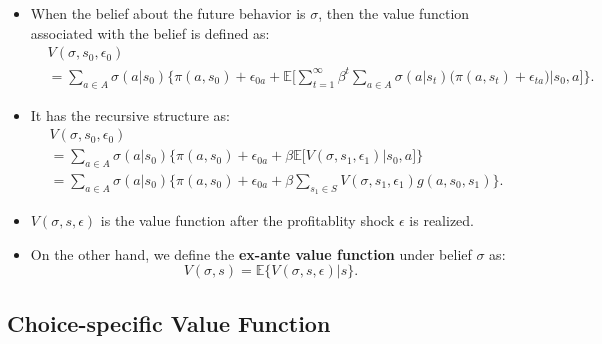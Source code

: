 \documentclass[
]{book}
\providecommand{\tightlist}{%
  \setlength{\itemsep}{0pt}\setlength{\parskip}{0pt}}
\begin{document}
\begin{itemize}
\tightlist
\item
  When the belief about the future behavior is \(\sigma\), then the value function associated with the belief is defined as:
  \begin{equation}
  \begin{split}
  &V(\sigma, s_0, \epsilon_0)\\
  &= \sum_{a \in A} \sigma(a|s_0) \Bigg\{\pi(a, s_0) + \epsilon_{0a} + \mathbb{E}\Bigg[ \sum_{t = 1}^\infty \beta^t \sum_{a \in A}\sigma(a|s_t)\Bigg(\pi(a, s_t) + \epsilon_{ta}\Bigg)\Bigg|s_0, a\Bigg] \Bigg\}.
  \end{split}
  \end{equation}
\item
  It has the recursive structure as:
  \begin{equation}
  \begin{split}
  &V(\sigma, s_0, \epsilon_0)\\
  & = \sum_{a \in A} \sigma(a|s_0) \Bigg\{\pi(a, s_0) + \epsilon_{0a} + \beta \mathbb{E}\Bigg[V(\sigma, s_1, \epsilon_1)\Bigg|s_0, a\Bigg]\Bigg\}\\
  & = \sum_{a \in A} \sigma(a|s_0) \Bigg\{\pi(a, s_0) + \epsilon_{0a} + \beta \sum_{s_1 \in S} V(\sigma, s_1, \epsilon_1)g(a, s_0, s_1)\Bigg\}.
  \end{split}
  \end{equation}
\item
  \(V(\sigma, s, \epsilon)\) is the value function after the profitablity shock \(\epsilon\) is realized.
\item
  On the other hand, we define the \textbf{ex-ante value function} under belief \(\sigma\) as:
  \begin{equation}
  V(\sigma, s) = \mathbb{E}\{V(\sigma, s, \epsilon)|s\}.
  \end{equation}
\end{itemize}

\hypertarget{choice-specific-value-function}{%
\subsection{Choice-specific Value Function}\label{choice-specific-value-function}}
\end{document}
